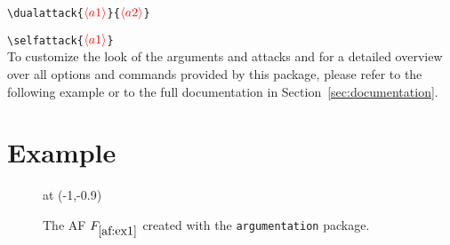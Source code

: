 \documentclass[headings=normal]{scrartcl}
\newcommand{\argumentation}{\texttt{argumentation}\xspace}
\newcommand{\opt}[2][red]{\ensuremath{\textcolor{#1}{\langle #2\rangle}}}
\begin{document}
\vspace{-0.3cm}
\verb|\dualattack{|\opt{a1}\verb|}{|\opt{a2}\verb|}|

\verb|\selfattack{|\opt{a1}\verb|}|\\

\noindent
To customize the look of the arguments and attacks and for a detailed overview over all options and commands provided by this package, please refer to the following example or to the full documentation in Section~\ref{sec:documentation}.

\newpage\section{Example}\label{sec:example}

\begin{figure}[ht]
    \centering
    \begin{af}


         at (-1,-0.9)

        

        \label{af:ex1}
    \end{af}
    \caption{The AF $F_{\ref{af:ex1}}$ created with the \argumentation package.}
    \label{fig:example}
\end{figure}
\end{document}
